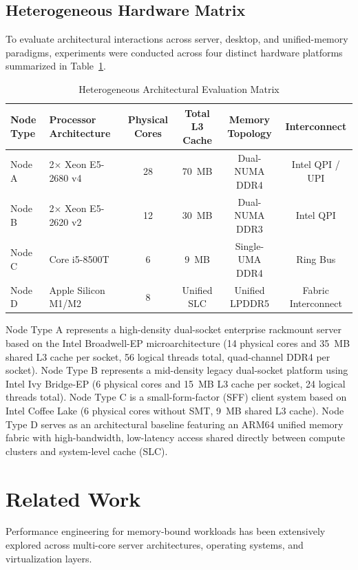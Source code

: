 \documentclass[journal]{IEEEtran}
\begin{document}
\subsection{Heterogeneous Hardware Matrix}
To evaluate architectural interactions across server, desktop, and unified-memory paradigms, experiments were conducted across four distinct hardware platforms summarized in Table~\ref{tab:hardware_matrix}.

\begin{table}[t]
\caption{Heterogeneous Architectural Evaluation Matrix}
\label{tab:hardware_matrix}
\centering
\begin{tabular}{llcccc}
\toprule
\textbf{Node Type} & \textbf{Processor Architecture} & \textbf{Physical Cores} & \textbf{Total L3 Cache} & \textbf{Memory Topology} & \textbf{Interconnect} \\
\midrule
Node A & 2$\times$ Xeon E5-2680 v4 & 28 & 70~MB & Dual-NUMA DDR4 & Intel QPI / UPI \\
Node B & 2$\times$ Xeon E5-2620 v2 & 12 & 30~MB & Dual-NUMA DDR3 & Intel QPI \\
Node C & Core i5-8500T & 6 & 9~MB & Single-UMA DDR4 & Ring Bus \\
Node D & Apple Silicon M1/M2 & 8 & Unified SLC & Unified LPDDR5 & Fabric Interconnect \\
\bottomrule
\end{tabular}
\end{table}

Node Type A represents a high-density dual-socket enterprise rackmount server based on the Intel Broadwell-EP microarchitecture (14 physical cores and 35~MB shared L3 cache per socket, 56 logical threads total, quad-channel DDR4 per socket). Node Type B represents a mid-density legacy dual-socket platform using Intel Ivy Bridge-EP (6 physical cores and 15~MB L3 cache per socket, 24 logical threads total). Node Type C is a small-form-factor (SFF) client system based on Intel Coffee Lake (6 physical cores without SMT, 9~MB shared L3 cache). Node Type D serves as an architectural baseline featuring an ARM64 unified memory fabric with high-bandwidth, low-latency access shared directly between compute clusters and system-level cache (SLC).

\section{Related Work}
Performance engineering for memory-bound workloads has been extensively explored across multi-core server architectures, operating systems, and virtualization layers.
\end{document}
